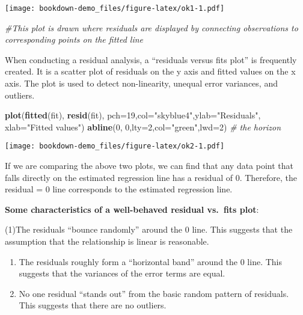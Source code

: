 \documentclass[]{book}
\newenvironment{Shaded}{\begin{snugshade}}{\end{snugshade}}
\newcommand{\KeywordTok}[1]{\textcolor[rgb]{0.13,0.29,0.53}{\textbf{#1}}}
\newcommand{\DataTypeTok}[1]{\textcolor[rgb]{0.13,0.29,0.53}{#1}}
\newcommand{\DecValTok}[1]{\textcolor[rgb]{0.00,0.00,0.81}{#1}}
\newcommand{\StringTok}[1]{\textcolor[rgb]{0.31,0.60,0.02}{#1}}
\newcommand{\CommentTok}[1]{\textcolor[rgb]{0.56,0.35,0.01}{\textit{#1}}}
\newcommand{\NormalTok}[1]{#1}
\theoremstyle{definition}
\theoremstyle{definition}
\theoremstyle{definition}
\theoremstyle{remark}
\begin{document}
\texttt{[image: bookdown-demo\_files/figure-latex/ok1-1.pdf]}

\begin{Shaded}
\begin{Highlighting}[]
\CommentTok{#This plot is drawn where residuals are displayed by connecting observations to corresponding points on the fitted line}
\end{Highlighting}
\end{Shaded}

When conducting a residual analysis, a ``residuals versus fits plot'' is
frequently created. It is a scatter plot of residuals on the y axis and
fitted values on the x axis. The plot is used to detect non-linearity,
unequal error variances, and outliers.

\begin{Shaded}
\begin{Highlighting}[]
\KeywordTok{plot}\NormalTok{(}\KeywordTok{fitted}\NormalTok{(fit), }\KeywordTok{resid}\NormalTok{(fit), }\DataTypeTok{pch=}\DecValTok{19}\NormalTok{,}\DataTypeTok{col=}\StringTok{"skyblue4"}\NormalTok{,}\DataTypeTok{ylab=}\StringTok{"Residuals"}\NormalTok{, }\DataTypeTok{xlab=}\StringTok{"Fitted values"}\NormalTok{) }
\KeywordTok{abline}\NormalTok{(}\DecValTok{0}\NormalTok{, }\DecValTok{0}\NormalTok{,}\DataTypeTok{lty=}\DecValTok{2}\NormalTok{,}\DataTypeTok{col=}\StringTok{"green"}\NormalTok{,}\DataTypeTok{lwd=}\DecValTok{2}\NormalTok{)                  }\CommentTok{# the horizon}
\end{Highlighting}
\end{Shaded}

\texttt{[image: bookdown-demo\_files/figure-latex/ok2-1.pdf]}

If we are comparing the above two plots, we can find that any data point
that falls directly on the estimated regression line has a residual of
0. Therefore, the residual = 0 line corresponds to the estimated
regression line.

\textbf{Some characteristics of a well-behaved residual vs.~fits plot}:

(1)The residuals ``bounce randomly'' around the 0 line. This suggests
that the assumption that the relationship is linear is reasonable.

\begin{enumerate}
\def\labelenumi{(\arabic{enumi})}
\setcounter{enumi}{1}
\item
  The residuals roughly form a ``horizontal band'' around the 0 line.
  This suggests that the variances of the error terms are equal.
\item
  No one residual ``stands out'' from the basic random pattern of
  residuals. This suggests that there are no outliers.
\end{enumerate}
\end{document}
